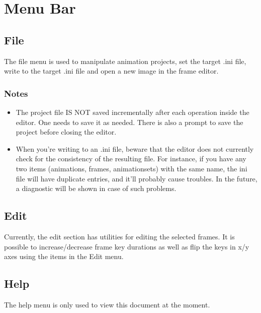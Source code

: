 \documentclass{article}
\begin{document}
\section{Menu Bar}

\subsection{File}
The file menu is used to manipulate animation projects, set the target .ini file, write to the target .ini file and open a new image in the frame editor.

\subsubsection{Notes}
\begin{itemize}
\item The project file IS NOT saved incrementally after each operation inside the editor. One needs to save it as needed. There is also a prompt to save
the project before closing the editor.
\item When you're writing to an .ini file, beware that the editor does not currently check for the consistency of the resulting file. For instance, if you have
any two items (animations, frames, animationsets) with the same name, the ini file will have duplicate entries, and it'll probably cause troubles. In the future,
a diagnostic will be shown in case of such problems.
\end{itemize}

\subsection{Edit}
Currently, the edit section has utilities for editing the selected frames. It is possible to increase/decrease frame key durations as well as flip the keys in x/y
axes using the items in the Edit menu.

\subsection{Help}
The help menu is only used to view this document at the moment.
\end{document}
